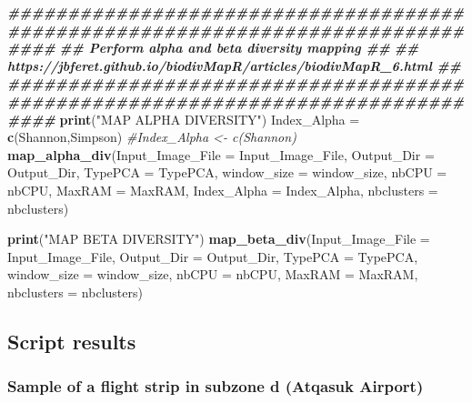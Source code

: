 \documentclass[
]{article}
\newenvironment{Shaded}{\begin{snugshade}}{\end{snugshade}}
\newcommand{\AttributeTok}[1]{\textcolor[rgb]{0.13,0.29,0.53}{#1}}
\newcommand{\CommentTok}[1]{\textcolor[rgb]{0.56,0.35,0.01}{\textit{#1}}}
\newcommand{\DocumentationTok}[1]{\textcolor[rgb]{0.56,0.35,0.01}{\textbf{\textit{#1}}}}
\newcommand{\FunctionTok}[1]{\textcolor[rgb]{0.13,0.29,0.53}{\textbf{#1}}}
\newcommand{\NormalTok}[1]{#1}
\newcommand{\OtherTok}[1]{\textcolor[rgb]{0.56,0.35,0.01}{#1}}
\newcommand{\StringTok}[1]{\textcolor[rgb]{0.31,0.60,0.02}{#1}}
\begin{document}
\begin{Shaded}
\begin{Highlighting}[]
\DocumentationTok{\#\#\#\#\#\#\#\#\#\#\#\#\#\#\#\#\#\#\#\#\#\#\#\#\#\#\#\#\#\#\#\#\#\#\#\#\#\#\#\#\#\#\#\#\#\#\#\#\#\#\#\#\#\#\#\#\#\#\#\#\#\#\#\#\#\#\#\#\#\#\#\#\#\#\#\#\#\#\#\#}
\DocumentationTok{\#\#                Perform alpha and beta diversity mapping                    \#\#}
\DocumentationTok{\#\# https://jbferet.github.io/biodivMapR/articles/biodivMapR\_6.html            \#\#}
\DocumentationTok{\#\#\#\#\#\#\#\#\#\#\#\#\#\#\#\#\#\#\#\#\#\#\#\#\#\#\#\#\#\#\#\#\#\#\#\#\#\#\#\#\#\#\#\#\#\#\#\#\#\#\#\#\#\#\#\#\#\#\#\#\#\#\#\#\#\#\#\#\#\#\#\#\#\#\#\#\#\#\#\#}
\FunctionTok{print}\NormalTok{(}\StringTok{"MAP ALPHA DIVERSITY"}\NormalTok{)}
\NormalTok{Index\_Alpha   }\OtherTok{=} \FunctionTok{c}\NormalTok{(}\StringTok{\textquotesingle{}Shannon\textquotesingle{}}\NormalTok{,}\StringTok{\textquotesingle{}Simpson\textquotesingle{}}\NormalTok{)}
\CommentTok{\#Index\_Alpha \textless{}{-} c(\textquotesingle{}Shannon\textquotesingle{})}
\FunctionTok{map\_alpha\_div}\NormalTok{(}\AttributeTok{Input\_Image\_File =}\NormalTok{ Input\_Image\_File,}
              \AttributeTok{Output\_Dir =}\NormalTok{ Output\_Dir,}
              \AttributeTok{TypePCA =}\NormalTok{ TypePCA,}
              \AttributeTok{window\_size =}\NormalTok{ window\_size,}
              \AttributeTok{nbCPU =}\NormalTok{ nbCPU,}
              \AttributeTok{MaxRAM =}\NormalTok{ MaxRAM,}
              \AttributeTok{Index\_Alpha =}\NormalTok{ Index\_Alpha,}
              \AttributeTok{nbclusters =}\NormalTok{ nbclusters)}

\FunctionTok{print}\NormalTok{(}\StringTok{"MAP BETA DIVERSITY"}\NormalTok{)}
\FunctionTok{map\_beta\_div}\NormalTok{(}\AttributeTok{Input\_Image\_File =}\NormalTok{ Input\_Image\_File,}
             \AttributeTok{Output\_Dir =}\NormalTok{ Output\_Dir,}
             \AttributeTok{TypePCA =}\NormalTok{ TypePCA,}
             \AttributeTok{window\_size =}\NormalTok{ window\_size,}
             \AttributeTok{nbCPU =}\NormalTok{ nbCPU,}
             \AttributeTok{MaxRAM =}\NormalTok{ MaxRAM,}
             \AttributeTok{nbclusters =}\NormalTok{ nbclusters)}
\end{Highlighting}
\end{Shaded}

\subsection{Script results}\label{script-results}

\subsubsection{Sample of a flight strip in subzone d (Atqasuk
Airport)}\label{sample-of-a-flight-strip-in-subzone-d-atqasuk-airport}
\end{document}
